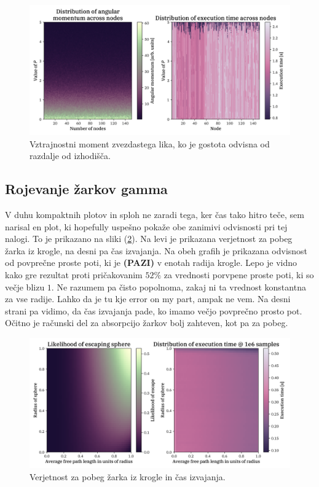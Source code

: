 \documentclass[a4paper]{article}
\begin{document}
\begin{figure}[H]
    \centering
    \includegraphics[width=\textwidth]{../StarShapes/Images/angular_radial_heatmaps.png}
    \caption{Vztrajnostni moment zvezdastega lika, ko je gostota odvisna od razdalje od izhodišča.}
    \label{fig:angular_radial_heatmaps}
\end{figure}

\subsection{Rojevanje žarkov gamma}
V duhu kompaktnih plotov in sploh ne zaradi tega, ker čas tako hitro teče, sem narisal en plot, ki hopefully uspešno 
pokaže obe zanimivi odvisnosti pri tej nalogi. To je prikazano na sliki (\ref{fig:XR_scaling}). Na levi je prikazana
verjetnost za pobeg žarka iz krogle, na desni pa čas izvajanja. Na obeh grafih je prikazana odvisnost od povprečne
proste poti, ki je \textbf{(PAZI)} v enotah radija krogle. Lepo je vidno kako gre rezultat proti pričakovanim 
$52\%$ za vrednosti porvpene proste poti, ki so večje blizu $1$. Ne razumem pa čisto popolnoma, zakaj ni ta vrednost 
konstantna za vse radije. Lahko da je tu kje error on my part, ampak ne vem. Na desni strani pa vidimo, da čas izvajanja 
pade, ko imamo večjo povprečno prosto pot. Očitno je računski del za absorpcijo žarkov bolj zahteven, kot pa za
pobeg. \\

\begin{figure}[H]
    \centering
    \includegraphics[width=\textwidth]{../GammaBirth/Images/XR_scaling.png}
    \caption{Verjetnost za pobeg žarka iz krogle in čas izvajanja.}
    \label{fig:XR_scaling}
\end{figure}
\end{document}
